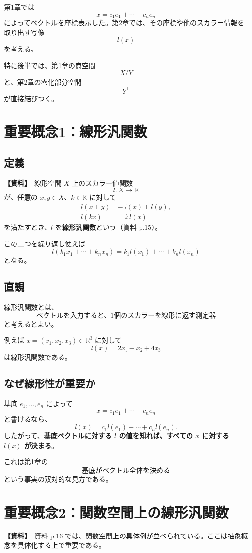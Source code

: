 \documentclass[a4paper,11pt]{ltjsarticle}
\newcommand{\R}{\mathbb{R}}
\newcommand{\K}{\mathbb{K}}
\newcommand{\sourceitem}{\textbf{【資料】}}
\begin{document}
第1章では
\[
 x=c_1e_1+\cdots+c_ne_n
\]
によってベクトルを座標表示した。第2章では、その座標や他のスカラー情報を取り出す写像
\[
 l(x)
\]
を考える。

特に後半では、第1章の商空間
\[
X/Y
\]
と、第2章の零化部分空間
\[
Y^\perp
\]
が直接結びつく。

\section{重要概念1：線形汎関数}

\subsection{定義}
\sourceitem\ 線形空間 $X$ 上のスカラー値関数
\[
 l:X\to\K
\]
が、任意の $x,y\in X$、$k\in\K$ に対して
\begin{align}
 l(x+y)&=l(x)+l(y),\\
 l(kx)&=k\,l(x)
\end{align}
を満たすとき、$l$ を\textbf{線形汎関数}という（資料 p.15）。

この二つを繰り返し使えば
\[
 l(k_1x_1+\cdots+k_nx_n)
 =k_1l(x_1)+\cdots+k_nl(x_n)
\]
となる。

\subsection{直観}
線形汎関数とは、
\[
\boxed{\text{ベクトルを入力すると、1個のスカラーを線形に返す測定器}}
\]
と考えるとよい。

例えば $x=(x_1,x_2,x_3)\in\R^3$ に対して
\[
 l(x)=2x_1-x_2+4x_3
\]
は線形汎関数である。

\subsection{なぜ線形性が重要か}
基底 $e_1,\dots,e_n$ によって
\[
 x=c_1e_1+\cdots+c_ne_n
\]
と書けるなら、
\[
 l(x)=c_1l(e_1)+\cdots+c_nl(e_n).
\]
したがって、\textbf{基底ベクトルに対する $l$ の値を知れば、すべての $x$ に対する $l(x)$ が決まる}。

これは第1章の
\[
\text{基底がベクトル全体を決める}
\]
という事実の双対的な見方である。

\section{重要概念2：関数空間上の線形汎関数}

\sourceitem\ 資料 p.16 では、関数空間上の具体例が並べられている。ここは抽象概念を具体化する上で重要である。
\end{document}
